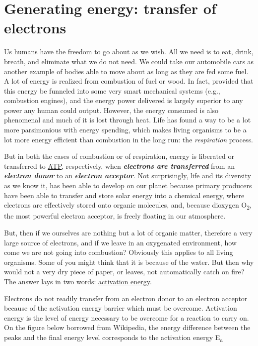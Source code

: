 \documentclass[]{book}
\theoremstyle{definition}
\theoremstyle{definition}
\theoremstyle{definition}
\theoremstyle{remark}
\begin{document}
\hypertarget{generating-energy-transfer-of-electrons}{\section{Generating
energy: transfer of
electrons}\label{generating-energy-transfer-of-electrons}}

Us humans have the freedom to go about as we wish. All we need is to
eat, drink, breath, and eliminate what we do not need. We could take our
automobile cars as another example of bodies able to move about as long
as they are fed some fuel. A lot of energy is realized from combustion
of fuel or wood. In fact, provided that this energy be funneled into
some very smart mechanical systems (e.g., combustion engines), and the
energy power delivered is largely superior to any power any human could
output. However, the energy consumed is also phenomenal and much of it
is lost through heat. Life has found a way to be a lot more parsimonious
with energy spending, which makes living organisms to be a lot more
energy efficient than combustion in the long run: the \emph{respiration}
process.

But in both the cases of combustion or of respiration, energy is
liberated or transferred to \protect\hyperlink{ATP}{ATP}, respectively,
when \emph{\textbf{electrons are transferred}} from an
\emph{\textbf{electron donor}} to an \emph{\textbf{electron acceptor}}.
Not surprisingly, life and its diversity as we know it, has been able to
develop on our planet because primary producers have been able to
transfer and store solar energy into a chemical energy, where electrons
are effectively stored onto organic molecules, and, because dioxygen
O\textsubscript{2}, the most powerful electron acceptor, is freely
floating in our atmosphere.

But, then if we ourselves are nothing but a lot of organic matter,
therefore a very large source of electrons, and if we leave in an
oxygenated environment, how come we are not going into combustion?
Obviously this applies to all living organisms. Some of you might think
that it is because of the water. But then why would not a very dry piece
of paper, or leaves, not automatically catch on fire? The answer lays in
two words:
\href{https://en.wikipedia.org/wiki/Activation_energy}{activation
energy}.

Electrons do not readily transfer from an electron donor to an electron
acceptor because of the activation energy barrier which must be
overcome. Activation energy is the level of energy necessary to be
overcome for a reaction to carry on. On the figure below borrowed from
Wikipedia, the energy difference between the peaks and the final energy
level corresponds to the activation energy E\textsubscript{a}
\end{document}
